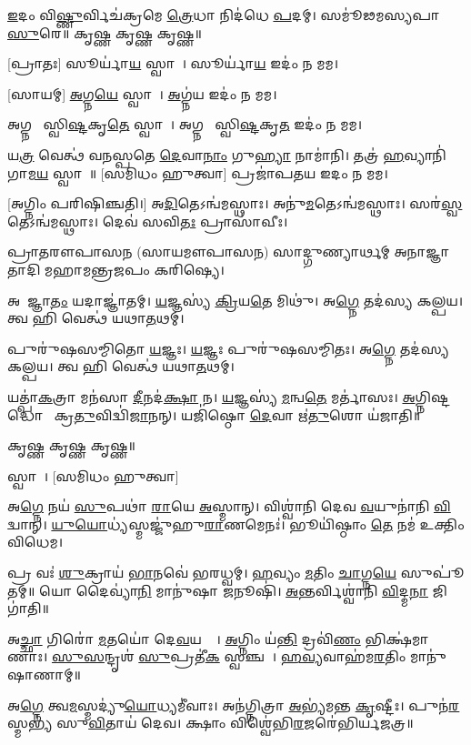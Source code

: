 \ul{𑌇}𑌦𑌂 𑌵𑌿\ul{𑌷𑍍𑌣𑍁}𑌰𑍍𑌵𑌿𑌚॑𑌕𑍍𑌰𑌮𑍇 \ul{𑌤𑍍𑌰𑍇}𑌧𑌾 𑌨𑌿𑌦॑𑌧𑍇 \ul{𑌪}𑌦𑌮𑍍। 𑌸𑌮𑍂॑𑌢𑌮𑌸𑍍𑌯𑌪𑌾 \ul{𑌸𑍁}𑌰𑍇॥ 𑌕𑍃𑌷𑍍𑌣 𑌕𑍃𑌷𑍍𑌣 𑌕𑍃𑌷𑍍𑌣॥

[𑌪𑍍𑌰𑌾𑌤𑌃] 𑌸𑍂𑌰𑍍𑌯𑌾॑\ul{𑌯} 𑌸𑍍𑌵𑌾𑌹𑌾᳚। 𑌸𑍂𑌰𑍍𑌯𑌾॑\ul{𑌯} 𑌇𑌦𑌂॑ 𑌨 𑌮𑌮।

[𑌸𑌾𑌯𑌮𑍍] \ul{𑌅}𑌗𑍍𑌨\ul{𑌯𑍇} 𑌸𑍍𑌵𑌾𑌹𑌾᳚। \ul{𑌅}𑌗𑍍𑌨॑𑌯 𑌇𑌦𑌂॑ 𑌨 𑌮𑌮।

𑌅𑌗𑍍𑌨𑌯𑍇᳚ 𑌸𑍍𑌵𑌿\ul{𑌷𑍍𑌟}𑌕𑍃\ul{𑌤𑍇} 𑌸𑍍𑌵𑌾𑌹𑌾᳚। 𑌅𑌗𑍍𑌨𑌯𑍇᳚ 𑌸𑍍𑌵𑌿\ul{𑌷𑍍𑌟}𑌕𑍃\ul{𑌤} 𑌇𑌦𑌂॑ 𑌨 𑌮𑌮।


𑌯\ul{𑌤𑍍𑌰} 𑌵𑍇𑌤𑍍𑌥॑ 𑌵𑌨𑌸𑍍𑌪𑌤𑍇 \ul{𑌦𑍇}𑌵𑌾\ul{𑌨𑌾𑌂} 𑌗𑍁\ul{𑌹𑍍𑌯𑌾} 𑌨𑌾𑌮𑌾॑𑌨𑌿। 𑌤𑌤𑍍𑌰॑ \ul{𑌹}𑌵𑍍𑌯𑌾𑌨𑌿॑ 𑌗𑌾\ul{𑌮}\ul{𑌯} 𑌸𑍍𑌵𑌾𑌹𑌾᳚॥ [𑌸𑌮𑌿𑌧𑌂 𑌹𑍁𑌤𑍍𑌵𑌾]
𑌪𑍍𑌰𑌜𑌾॑𑌪𑌤𑌯 𑌇𑌦𑌂 𑌨 𑌮𑌮। 

[𑌅𑌗𑍍𑌨𑌿𑌂 𑌪𑌰𑌿𑌷𑌿𑌞𑍍𑌚𑌤𑌿।]
𑌅\ul{𑌦𑌿}𑌤𑍇𑌽𑌨𑍍𑌵॑𑌮𑌸𑍍𑌥𑌾𑌃। 𑌅𑌨𑍁॑\ul{𑌮}𑌤𑍇𑌽𑌨𑍍𑌵॑𑌮𑌸𑍍𑌥𑌾𑌃। 𑌸𑌰॑\ul{𑌸𑍍𑌵}𑌤𑍇𑌽𑌨𑍍𑌵॑𑌮𑌸𑍍𑌥𑌾𑌃। 𑌦𑍇𑌵॑ 𑌸𑌵𑌿\ul{𑌤𑌃} 𑌪𑍍𑌰𑌾𑌸𑌾॑𑌵𑍀𑌃।


𑌪𑍍𑌰𑌾𑌤𑌰𑍗𑌪𑌾𑌸𑌨 (𑌸𑌾𑌯𑌮𑍗𑌪𑌾𑌸𑌨) 𑌸𑌾𑌦𑍍𑌗𑍁𑌣𑍍𑌯𑌾𑌰𑍍𑌥𑌮𑍍 𑌅𑌨𑌾𑌜𑍍𑌞𑌾𑌤𑌾𑌦𑌿 𑌮𑌹𑌾𑌮𑌨𑍍𑌤𑍍𑌰𑌜𑌪𑌂 𑌕𑌰𑌿𑌷𑍍𑌯𑍇।

𑌅𑌨𑌾᳚𑌜𑍍𑌞𑌾\ul{𑌤𑌂} 𑌯𑌦𑌾𑌜𑍍𑌞𑌾॑𑌤𑌮𑍍। \ul{𑌯}𑌜𑍍𑌞𑌸𑍍𑌯॑ \ul{𑌕𑍍𑌰𑌿}𑌯\ul{𑌤𑍇} 𑌮𑌿𑌥𑍁॑।
𑌅\ul{𑌗𑍍𑌨𑍇} 𑌤𑌦॑𑌸𑍍𑌯 𑌕𑌲𑍍𑌪𑌯। 𑌤𑍍𑌵 𑌹𑌿 𑌵𑍇𑌤𑍍𑌥॑ 𑌯𑌥𑌾\ul{𑌤}𑌥𑌮𑍍।

𑌪𑍁𑌰𑍁॑𑌷𑌸𑌮𑍍𑌮𑌿𑌤𑍋 \ul{𑌯}𑌜𑍍𑌞𑌃। \ul{𑌯}𑌜𑍍𑌞𑌃 𑌪𑍁𑌰𑍁॑𑌷𑌸𑌮𑍍𑌮𑌿𑌤𑌃।
𑌅\ul{𑌗𑍍𑌨𑍇} 𑌤𑌦॑𑌸𑍍𑌯 𑌕𑌲𑍍𑌪𑌯। 𑌤𑍍𑌵 𑌹𑌿 𑌵𑍇𑌤𑍍𑌥॑ 𑌯𑌥𑌾\ul{𑌤}𑌥𑌮𑍍।

𑌯𑌤𑍍𑌪𑌾॑\ul{𑌕}𑌤𑍍𑌰𑌾 𑌮𑌨॑𑌸𑌾 \ul{𑌦𑍀}𑌨𑌦॑\ul{𑌕𑍍𑌷𑌾} 𑌨। \ul{𑌯}𑌜𑍍𑌞𑌸𑍍𑌯॑ \ul{𑌮}𑌨𑍍𑌵\ul{𑌤𑍇} 𑌮𑌰𑍍𑌤𑌾॑𑌸𑌃।
\ul{𑌅}𑌗𑍍𑌨𑌿𑌷𑍍𑌟𑌦𑍍𑌧𑍋𑌤𑌾᳚ 𑌕𑍍𑌰\ul{𑌤𑍁}𑌵𑌿𑌦𑍍𑌵𑌿॑\ul{𑌜𑌾}𑌨𑌨𑍍। 𑌯𑌜𑌿॑𑌷𑍍𑌠𑍋 \ul{𑌦𑍇}𑌵𑌾 𑌋॑\ul{𑌤𑍁}𑌶𑍋 𑌯॑𑌜𑌾𑌤𑌿॥

𑌕𑍃𑌷𑍍𑌣 𑌕𑍃𑌷𑍍𑌣 𑌕𑍃𑌷𑍍𑌣॥

𑌸𑍍𑌵𑌾𑌹𑌾᳚। [𑌸𑌮𑌿𑌧𑌂 𑌹𑍁𑌤𑍍𑌵𑌾]


𑌅\ul{𑌗𑍍𑌨𑍇} 𑌨𑌯॑ \ul{𑌸𑍁}𑌪𑌥𑌾॑ \ul{𑌰𑌾}𑌯𑍇 \ul{𑌅}𑌸𑍍𑌮𑌾𑌨𑍍। 𑌵𑌿𑌶𑍍𑌵𑌾॑𑌨𑌿 𑌦𑍇𑌵 \ul{𑌵}𑌯𑍁𑌨𑌾॑𑌨𑌿 \ul{𑌵𑌿}𑌦𑍍𑌵𑌾𑌨𑍍। \ul{𑌯𑍁}\ul{𑌯𑍋}𑌧𑍍𑌯॑𑌸𑍍𑌮𑌜𑍍𑌜𑍁॑𑌹𑍁\ul{𑌰𑌾}𑌣𑌮𑍇𑌨𑌃॑। 𑌭𑍂𑌯𑌿॑𑌷𑍍𑌠𑌾𑌂 \ul{𑌤𑍇} 𑌨𑌮॑ 𑌉𑌕𑍍𑌤𑌿𑌂 𑌵𑌿𑌧𑍇𑌮। 

𑌪𑍍𑌰 𑌵𑌃॑ \ul{𑌶𑍁}𑌕𑍍𑌰𑌾𑌯॑ \ul{𑌭𑌾}𑌨𑌵𑍇॑ 𑌭𑌰𑌧𑍍𑌵𑌮𑍍। \ul{𑌹}𑌵𑍍𑌯𑌂 \ul{𑌮}𑌤𑌿𑌂 \ul{𑌚𑌾}𑌗𑍍𑌨\ul{𑌯𑍇} 𑌸𑍁𑌪𑍂॑𑌤𑌮𑍍॥ 𑌯𑍋 𑌦𑍈𑌵𑍍𑌯𑌾॑\ul{𑌨𑌿} 𑌮𑌾𑌨𑍁॑𑌷𑌾 \ul{𑌜}𑌨𑍂𑌷𑌿॑। \ul{𑌅}𑌨𑍍𑌤𑌰𑍍𑌵𑌿𑌶𑍍𑌵𑌾॑𑌨𑌿 \ul{𑌵𑌿}𑌦𑍍𑌮\ul{𑌨𑌾} 𑌜𑌿𑌗𑌾॑𑌤𑌿॥

𑌅\ul{𑌚𑍍𑌛𑌾} 𑌗𑌿𑌰𑍋॑ \ul{𑌮}𑌤𑌯𑍋॑ 𑌦𑍇\ul{𑌵}𑌯𑌨𑍍𑌤𑍀𑌃᳚। \ul{𑌅}𑌗𑍍𑌨𑌿𑌂 𑌯॑\ul{𑌨𑍍𑌤𑌿} 𑌦𑍍𑌰𑌵𑌿॑\ul{𑌣𑌂} 𑌭𑌿𑌕𑍍𑌷॑𑌮𑌾𑌣𑌾𑌃।
\ul{𑌸𑍁}\ul{𑌸}𑌨𑍍𑌦𑍃𑌶॑ \ul{𑌸𑍁}𑌪𑍍𑌰𑌤𑍀॑\ul{𑌕}\ul{} 𑌸𑍍𑌵𑌞𑍍𑌚𑌮𑍍᳚। \ul{𑌹}\ul{𑌵𑍍𑌯}𑌵𑌾𑌹॑𑌮\ul{𑌰}𑌤𑌿𑌂 𑌮𑌾𑌨𑍁॑𑌷𑌾𑌣𑌾𑌮𑍍॥

𑌅\ul{𑌗𑍍𑌨𑍇} 𑌤𑍍𑌵\ul{𑌮}𑌸𑍍𑌮𑌦𑍍𑌯𑍁॑\ul{𑌯𑍋}𑌧𑍍𑌯𑌮𑍀॑𑌵𑌾𑌃। 𑌅𑌨॑𑌗𑍍𑌨𑌿𑌤𑍍𑌰𑌾 \ul{𑌅}𑌭𑍍𑌯॑𑌮𑌨𑍍𑌤 \ul{𑌕𑍃}𑌷𑍍𑌟𑍀𑌃।
𑌪𑍁𑌨॑\ul{𑌰}𑌸𑍍𑌮𑌭𑍍𑌯॑ 𑌸𑍁\ul{𑌵𑌿}𑌤𑌾𑌯॑ 𑌦𑍇𑌵। 𑌕𑍍𑌷𑌾𑌂 𑌵𑌿𑌶𑍍𑌵𑍇॑𑌭𑌿\ul{𑌰}𑌜𑌰𑍇॑𑌭𑌿𑌰𑍍𑌯𑌜𑌤𑍍𑌰॥ 

